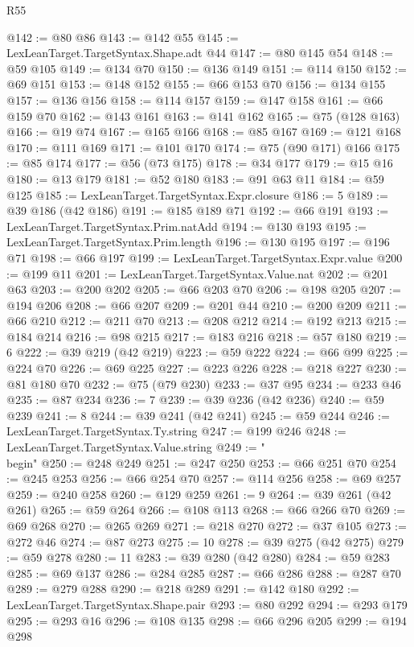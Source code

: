 \begin{lexlean}{R55}
\begin{coremodule}
{{{{{{{{{{{{{{{{{{{{{{{{{{{{{{{{{{{{{{{{{{{{{{{{{{{{{{{{{{{{{{{{{{{{{{{{{{{{{{{{@142 := @80 @86
@143 := @142 @55
@145 := LexLeanTarget.TargetSyntax.Shape.adt @44
@147 := @80 @145 @54
@148 := @59 @105
@149 := @134 @70
@150 := @136 @149
@151 := @114 @150
@152 := @69 @151
@153 := @148 @152
@155 := @66 @153 @70
@156 := @134 @155
@157 := @136 @156
@158 := @114 @157
@159 := @147 @158
@161 := @66 @159 @70
@162 := @143 @161
@163 := @141 @162
@165 := @75 (@128 @163)
@166 := @19 @74
@167 := @165 @166
@168 := @85 @167
@169 := @121 @168
@170 := @111 @169
@171 := @101 @170
@174 := @75 (@90 @171) @166
@175 := @85 @174
@177 := @56 (@73 @175)
@178 := @34 @177
@179 := @15 @16
@180 := @13 @179
@181 := @52 @180
@183 := @91 @63 @11
@184 := @59 @125
@185 := LexLeanTarget.TargetSyntax.Expr.closure
@186 := 5
@189 := @39 @186 (@42 @186)
@191 := @185 @189 @71
@192 := @66 @191
@193 := LexLeanTarget.TargetSyntax.Prim.natAdd
@194 := @130 @193
@195 := LexLeanTarget.TargetSyntax.Prim.length
@196 := @130 @195
@197 := @196 @71
@198 := @66 @197
@199 := LexLeanTarget.TargetSyntax.Expr.value
@200 := @199 @11
@201 := LexLeanTarget.TargetSyntax.Value.nat
@202 := @201 @63
@203 := @200 @202
@205 := @66 @203 @70
@206 := @198 @205
@207 := @194 @206
@208 := @66 @207
@209 := @201 @44
@210 := @200 @209
@211 := @66 @210
@212 := @211 @70
@213 := @208 @212
@214 := @192 @213
@215 := @184 @214
@216 := @98 @215
@217 := @183 @216
@218 := @57 @180
@219 := 6
@222 := @39 @219 (@42 @219)
@223 := @59 @222
@224 := @66 @99
@225 := @224 @70
@226 := @69 @225
@227 := @223 @226
@228 := @218 @227
@230 := @81 @180 @70
@232 := @75 (@79 @230)
@233 := @37 @95
@234 := @233 @46
@235 := @87 @234
@236 := 7
@239 := @39 @236 (@42 @236)
@240 := @59 @239
@241 := 8
@244 := @39 @241 (@42 @241)
@245 := @59 @244
@246 := LexLeanTarget.TargetSyntax.Ty.string
@247 := @199 @246
@248 := LexLeanTarget.TargetSyntax.Value.string
@249 := "\\begin"
@250 := @248 @249
@251 := @247 @250
@253 := @66 @251 @70
@254 := @245 @253
@256 := @66 @254 @70
@257 := @114 @256
@258 := @69 @257
@259 := @240 @258
@260 := @129 @259
@261 := 9
@264 := @39 @261 (@42 @261)
@265 := @59 @264
@266 := @108 @113
@268 := @66 @266 @70
@269 := @69 @268
@270 := @265 @269
@271 := @218 @270
@272 := @37 @105
@273 := @272 @46
@274 := @87 @273
@275 := 10
@278 := @39 @275 (@42 @275)
@279 := @59 @278
@280 := 11
@283 := @39 @280 (@42 @280)
@284 := @59 @283
@285 := @69 @137
@286 := @284 @285
@287 := @66 @286
@288 := @287 @70
@289 := @279 @288
@290 := @218 @289
@291 := @142 @180
@292 := LexLeanTarget.TargetSyntax.Shape.pair
@293 := @80 @292
@294 := @293 @179
@295 := @293 @16
@296 := @108 @135
@298 := @66 @296 @205
@299 := @194 @298
}}}}}}}}}}}}}}}}}}}}}}}}}}}}}}}}}}}}}}}}}}}}}}}}}}}}}}}}}}}}}}}}}}}}}}}}}}}}}}}}
\end{coremodule}
\end{lexlean}
